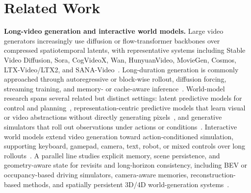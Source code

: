 \documentclass{llmxive}
\begin{document}
\section{Related Work}
\label{sec:related_work}











\noindent\textbf{Long-video generation and interactive world models.}
Large video generators increasingly use diffusion or flow-transformer backbones over compressed spatiotemporal latents, with representative systems including Stable Video Diffusion, Sora, CogVideoX, Wan, HunyuanVideo, MovieGen, Cosmos, LTX-Video/LTX2, and SANA-Video~\citep{stable_video_diffusion,sora,cogvideox,wan,hunyuanvideo,moviegen,cosmos,ltx_video,ltx2,chen2025sana}.
Long-duration generation is commonly approached through autoregressive or block-wise rollout, diffusion forcing, streaming training, and memory- or cache-aware inference~\citep{skyreels_v2,magi,huang2024selfforcing,longlive,chen2025sana}.
World-model research spans several related but distinct settings: latent predictive models for control and planning~\citep{world_models,dreamerv3}, representation-centric predictive models that learn visual or video abstractions without directly generating pixels~\citep{i_jepa,v_jepa,v_jepa2}, and generative simulators that roll out observations under actions or conditions~\citep{gaia1,genie,genie2,genie3,gamengen,oasis,gamegen,matrixgame,matrixgame3,relic,live_world,astra,magicworld,lingbot_world,infinite_world,yume,hy_worldplay}.
Interactive world models extend video generation toward action-conditioned simulation, supporting keyboard, gamepad, camera, text, robot, or mixed controls over long rollouts~\citep{dreamzero,dreamdojo,genie3,gamegen,matrixgame,matrixgame3,unisim,yume,aether,hy_worldplay,lingbot_world,worldcam,ucm,captain_safari,deepverse}.
A parallel line studies explicit memory, scene persistence, and geometry-aware state for revisits and long-horizon consistency, including BEV or occupancy-based driving simulators, camera-aware memories, reconstruction-based methods, and spatially persistent 3D/4D world-generation systems~\citep{drivedreamer,driveworld,ucm,mosaicmem,captain_safari,memorize_when_needed,vggt_world,aether,deepverse,versecrafter,hy_world2,inspatio_world,worldcam}.
\end{document}
